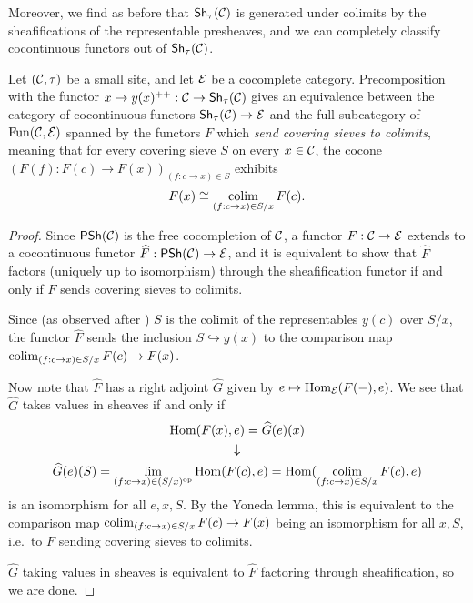 Moreover, we find as before that $\Sh_\tau(\catC)$ is generated under colimits by the sheafifications of the representable presheaves, and we can completely classify cocontinuous functors out of $\Sh_\tau(\catC)$.

\begin{proposition}\label{prop:chap:sheaves:sec:sites:universal property of sheaves}
    Let $(\catC,\tau)$ be a small site, and let $\cal{E}$ be a cocomplete category. Precomposition with the functor $x \mapsto y(x)^{++} : \catC \to \Sh_{\tau}(\catC)$ gives an equivalence between the category of cocontinuous functors $\Sh_{\tau}(\catC) \to \cal{E}$ and the full subcategory of $\Fun(\catC,\cal{E})$ spanned by the functors $F$ which \emph{send covering sieves to colimits}, meaning that for every covering sieve $S$ on every $x \in \catC$, the cocone $(F(f) : F(c) \to F(x))_{(f : c \to x) \in S}$ exhibits
    \[F(x) \cong \colim_{(f : c \to x) \in S/x} F(c).\]
\end{proposition}
\begin{proof}
    Since $\PSh(\catC)$ is the free cocompletion of $\catC$, a functor $F : \catC \to \cal{E}$ extends to a cocontinuous functor $\widehat{F} : \PSh(\catC) \to \cal{E}$, and it is equivalent to show that $\widehat{F}$ factors (uniquely up to isomorphism) through the sheafification functor if and only if $F$ sends covering sieves to colimits.

    Since (as observed after ) $S$ is the colimit of the representables $y(c)$ over $S/x$, the functor $\widehat{F}$ sends the inclusion $S \hookrightarrow y(x)$ to the comparison map $\colim_{(f : c \to x) \in S/x} F(c) \to F(x)$.

    Now note that $\widehat{F}$ has a right adjoint $\widehat{G}$ given by $e \mapsto \Hom_\cal{E}(F(-),e)$. We see that $\widehat{G}$ takes values in sheaves if and only if
    \begin{gather*}
        \Hom(F(x), e) = \widehat{G}(e)(x) \\
        \downarrow                        \\
        \widehat{G}(e)(S)
        = \lim_{(f : c \to x) \in (S/x)^\op} \Hom(F(c), e) = \Hom(\colim_{(f : c \to x) \in S/x} F(c), e)
    \end{gather*}
    is an isomorphism for all $e, x, S$. By the Yoneda lemma, this is equivalent to the comparison map $\colim_{(f : c \to x) \in S/x} F(c) \to F(x)$ being an isomorphism for all $x, S$, i.e.\ to $F$ sending covering sieves to colimits.

    $\widehat{G}$ taking values in sheaves is equivalent to $\widehat{F}$ factoring through sheafification, so we are done.
\end{proof}

